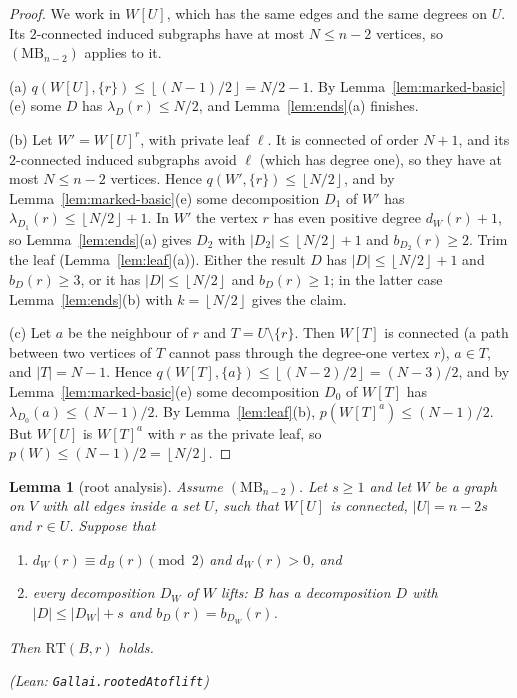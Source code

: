 \documentclass[11pt]{amsart}
\newtheorem{lemma}[theorem]{Lemma}
\theoremstyle{definition}
\theoremstyle{remark}
\renewcommand{\_}{\oldunderscore\allowbreak}
\newcommand{\leanst}[1]{\par{\raggedright\small\textup{(Lean: \texttt{#1})}\par}}
\newcommand{\fl}[1]{\left\lfloor #1\right\rfloor}
\newcommand{\MBU}{\mathrm{MB}}
\newcommand{\RT}{\mathrm{RT}}
\begin{document}
\begin{proof}
We work in $W[U]$, which has the same edges and the same degrees on $U$. Its $2$-connected induced
subgraphs have at most $N\le n-2$ vertices, so $(\MBU_{n-2})$ applies to it.

(a) $q(W[U],\{r\})\le\fl{(N-1)/2}=N/2-1$. By Lemma~\ref{lem:marked-basic}(e) some $D$ has
$\lambda_D(r)\le N/2$, and Lemma~\ref{lem:ends}(a) finishes.

(b) Let $W'=W[U]^r$, with private leaf $\ell$. It is connected of order $N+1$, and its $2$-connected
induced subgraphs avoid $\ell$ (which has degree one), so they have at most $N\le n-2$ vertices.
Hence $q(W',\{r\})\le\fl{N/2}$, and by Lemma~\ref{lem:marked-basic}(e) some decomposition $D_1$ of
$W'$ has $\lambda_{D_1}(r)\le\fl{N/2}+1$. In $W'$ the vertex $r$ has even positive degree
$d_W(r)+1$, so Lemma~\ref{lem:ends}(a) gives $D_2$ with $|D_2|\le\fl{N/2}+1$ and $b_{D_2}(r)\ge2$.
Trim the leaf (Lemma~\ref{lem:leaf}(a)). Either the result $D$ has $|D|\le\fl{N/2}+1$ and
$b_D(r)\ge3$, or it has $|D|\le\fl{N/2}$ and $b_D(r)\ge1$; in the latter case
Lemma~\ref{lem:ends}(b) with $k=\fl{N/2}$ gives the claim.

(c) Let $a$ be the neighbour of $r$ and $T=U\setminus\{r\}$. Then $W[T]$ is connected (a path between
two vertices of $T$ cannot pass through the degree-one vertex $r$), $a\in T$, and $|T|=N-1$. Hence
$q(W[T],\{a\})\le\fl{(N-2)/2}=(N-3)/2$, and by Lemma~\ref{lem:marked-basic}(e) some decomposition
$D_0$ of $W[T]$ has $\lambda_{D_0}(a)\le(N-1)/2$. By Lemma~\ref{lem:leaf}(b),
$p(W[T]^a)\le(N-1)/2$. But $W[U]$ is $W[T]^a$ with $r$ as the private leaf, so
$p(W)\le(N-1)/2=\fl{N/2}$.
\end{proof}

\begin{lemma}[root analysis]\label{lem:root}
Assume $(\MBU_{n-2})$. Let $s\ge1$ and let $W$ be a graph on $V$ with all edges inside a set $U$,
such that $W[U]$ is connected, $|U|=n-2s$ and $r\in U$. Suppose that
\begin{enumerate}[label=\textup{(\roman*)}]
\item $d_W(r)\equiv d_B(r)\pmod2$ and $d_W(r)>0$, and
\item every decomposition $D_W$ of $W$ \emph{lifts}: $B$ has a decomposition $D$ with
$|D|\le|D_W|+s$ and $b_D(r)=b_{D_W}(r)$.
\end{enumerate}
Then $\RT(B,r)$ holds.
\leanst{Gallai.rootedAt\_of\_lift}
\end{lemma}
\end{document}
